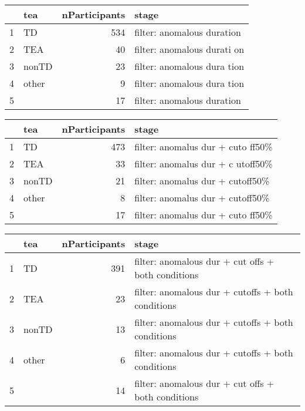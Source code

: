 \documentclass{article}
\begin{document}
\begin{table}[ht]
\centering
\begin{tabular}{rlrl}
  \hline
 & tea & nParticipants & stage \\ 
  \hline
1 & TD & 534 & filter: anomalous duration 
\\ 
  2 & TEA &  40 & filter: anomalous durati
on \\ 
  3 & nonTD &  23 & filter: anomalous dura
tion \\ 
  4 & other &   9 & filter: anomalous dura
tion \\ 
  5 &  &  17 & filter: anomalous duration 
\\ 
   \hline
\end{tabular}
\end{table}

\begin{table}[ht]
\centering
\begin{tabular}{rlrl}
  \hline
 & tea & nParticipants & stage \\ 
  \hline
1 & TD & 473 & filter: anomalus dur + cuto
ff50\% \\ 
  2 & TEA &  33 & filter: anomalus dur + c
utoff50\% \\ 
  3 & nonTD &  21 & filter: anomalus dur +
 cutoff50\% \\ 
  4 & other &   8 & filter: anomalus dur +
 cutoff50\% \\ 
  5 &  &  17 & filter: anomalus dur + cuto
ff50\% \\ 
   \hline
\end{tabular}
\end{table}

\begin{table}[ht]
\centering
\begin{tabular}{rlrl}
  \hline
 & tea & nParticipants & stage \\ 
  \hline
1 & TD & 391 & filter: anomalous dur + cut
offs + both conditions \\ 
  2 & TEA &  23 & filter: anomalous dur + 
cutoffs + both conditions \\ 
  3 & nonTD &  13 & filter: anomalous dur 
+ cutoffs + both conditions \\ 
  4 & other &   6 & filter: anomalous dur 
+ cutoffs + both conditions \\ 
  5 &  &  14 & filter: anomalous dur + cut
offs + both conditions \\ 
   \hline
\end{tabular}
\end{table}
\end{document}
